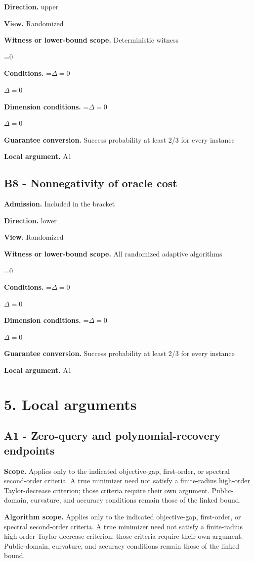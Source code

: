 \documentclass[10pt,a4paper]{article}
\newcommand{\AtlasMath}[1]{\par\begingroup\centering\setbox0=\hbox{$\displaystyle #1$}\ifdim\wd0>1.4\linewidth\typeout{ATLAS WIDE FORMULA: \the\wd0}\fi\ifdim\wd0>\linewidth\resizebox{\linewidth}{!}{\box0}\else\box0\fi\par\endgroup}
\newcommand{\AtlasInlineMath}[1]{\begingroup\setbox0=\hbox{$#1$}\ifdim\wd0>.4\linewidth\endgroup\AtlasMath{#1}\else\endgroup$#1$\fi}
\begin{document}
\textbf{Direction.} upper

\textbf{View.} Randomized

\textbf{Witness or lower-bound scope.} Deterministic witness

\AtlasMath{0}
\textbf{Conditions.} \AtlasInlineMath{\Delta=0}

\textbf{Dimension conditions.} \AtlasInlineMath{\Delta=0}

\textbf{Guarantee conversion.} Success probability at least 2/3 for every instance

\textbf{Local argument.} A1

\subsection{B8 - Nonnegativity of oracle cost}
\textbf{Admission.} Included in the bracket

\textbf{Direction.} lower

\textbf{View.} Randomized

\textbf{Witness or lower-bound scope.} All randomized adaptive algorithms

\AtlasMath{0}
\textbf{Conditions.} \AtlasInlineMath{\Delta=0}

\textbf{Dimension conditions.} \AtlasInlineMath{\Delta=0}

\textbf{Guarantee conversion.} Success probability at least 2/3 for every instance

\textbf{Local argument.} A1

\section{5. Local arguments}
\subsection{A1 - Zero-query and polynomial-recovery endpoints}
\textbf{Scope.} Applies only to the indicated objective-gap, first-order, or spectral second-order criteria. A true minimizer need not satisfy a finite-radius high-order Taylor-decrease criterion; those criteria require their own argument. Public-domain, curvature, and accuracy conditions remain those of the linked bound.

\textbf{Algorithm scope.} Applies only to the indicated objective-gap, first-order, or spectral second-order criteria. A true minimizer need not satisfy a finite-radius high-order Taylor-decrease criterion; those criteria require their own argument. Public-domain, curvature, and accuracy conditions remain those of the linked bound.
\end{document}

